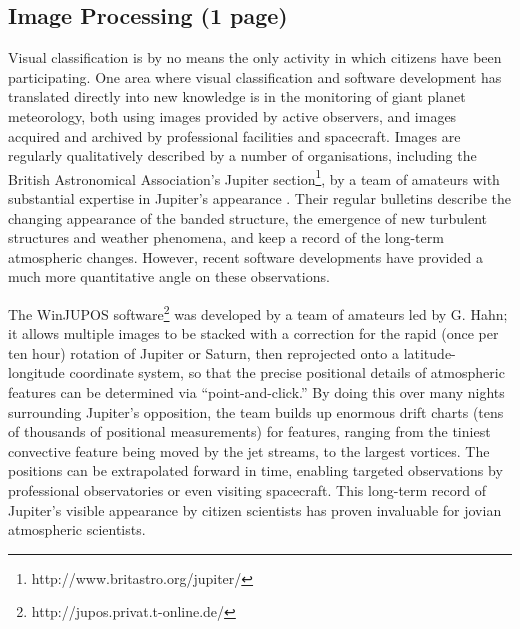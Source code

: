 \documentclass{ar2e}
\begin{document}


\subsection{Image Processing (1 page)}
\label{sec:class:non-sensory}

Visual classification is by no means the only activity in which citizens have
been participating.  One area where visual classification and software
development has translated directly into new knowledge is in the monitoring of
giant planet meteorology, both using images provided by active observers, and
images acquired and archived by professional facilities and spacecraft. 
Images are regularly qualitatively described by a number of organisations,
including the British Astronomical Association's Jupiter
section\footnote{http://www.britastro.org/jupiter/}, by a team of amateurs
with substantial expertise in Jupiter's appearance \citep{95rogers}.  Their
regular bulletins describe the changing appearance of the banded structure,
the emergence of new turbulent structures and weather phenomena, and keep a
record of the long-term atmospheric changes.  However, recent software
developments have provided a much more quantitative angle on these
observations.  


The WinJUPOS software\footnote{http://jupos.privat.t-online.de/} was developed
by a team of amateurs led by G. Hahn; it allows multiple images to be stacked
with a correction for the rapid (once per ten hour) rotation of Jupiter or
Saturn, then reprojected onto a latitude-longitude coordinate system, so that
the precise positional details of atmospheric features can be determined via
``point-and-click.''  By doing this over many nights surrounding Jupiter's
opposition, the team builds up enormous drift charts (tens of thousands of
positional measurements) for features, ranging from the tiniest convective
feature being moved by the jet streams, to the largest vortices.  The positions
can be extrapolated forward in time, enabling targeted observations by
professional observatories or even visiting spacecraft.  This long-term record
of Jupiter's visible appearance by citizen scientists has proven invaluable for
jovian atmospheric scientists.
\end{document}
